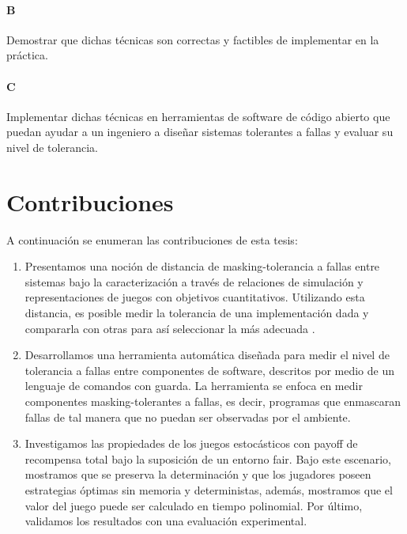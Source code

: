 \paragraph{B}
Demostrar que dichas técnicas son correctas y factibles de implementar en la práctica.

\paragraph{C}
Implementar dichas técnicas en herramientas de software de código abierto que puedan ayudar a un ingeniero a diseñar sistemas tolerantes a fallas y evaluar su nivel de tolerancia.


\section{Contribuciones}
\label{sec:intro.contribuciones}

A continuación se enumeran las contribuciones de esta tesis:

\begin{enumerate}
	\item Presentamos una noción de distancia de masking-tolerancia a fallas entre sistemas bajo la caracterización a través de relaciones de simulación y representaciones de juegos con objetivos cuantitativos. 
    Utilizando esta distancia, es posible medir la tolerancia de una implementación dada y compararla con otras para así seleccionar la más adecuada \cite{CastroDDP18b}.
	
	\item Desarrollamos una herramienta automática diseñada para medir el nivel de tolerancia a fallas entre componentes de software, descritos por medio de un lenguaje de comandos con guarda. La herramienta se enfoca en medir componentes masking-tolerantes a fallas, es decir, programas que enmascaran fallas de tal manera que no puedan ser observadas por el ambiente\cite{PutrueleDCD22}. 

    \item Investigamos las propiedades de los juegos estocásticos con payoff de recompensa total bajo la suposición de un entorno fair. Bajo este escenario, mostramos que se preserva la determinación y que los jugadores poseen estrategias óptimas sin memoria y deterministas, además, mostramos que el valor del juego puede  ser calculado en tiempo polinomial. Por último, validamos los resultados con una evaluación experimental\cite{?}.  %
 
\end{enumerate}

